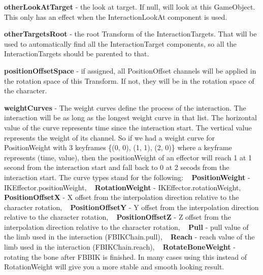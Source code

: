 \begin{DoxyItemize}
\item {\bfseries other\+Look\+At\+Target} -\/ the look at target. If null, will look at this Game\+Object. This only has an effect when the Interaction\+Look\+At component is used.
\item {\bfseries other\+Targets\+Root} -\/ the root Transform of the Interaction\+Targets. That will be used to automatically find all the Interaction\+Target components, so all the Interaction\+Targets should be parented to that.
\item {\bfseries position\+Offset\+Space} -\/ if assigned, all Position\+Offset channels will be applied in the rotation space of this Transform. If not, they will be in the rotation space of the character.
\item {\bfseries weight\+Curves} -\/ The weight curves define the process of the interaction. The interaction will be as long as the longest weight curve in that list. The horizontal value of the curve represents time since the interaction start. The vertical value represents the weight of it\textquotesingle{}s channel. So if we had a weight curve for Position\+Weight with 3 keyframes \{(0, 0), (1, 1), (2, 0)\} where a keyframe represents (time, value), then the position\+Weight of an effector will reach 1 at 1 second from the interaction start and fall back to 0 at 2 secods from the interaction start. The curve types stand for the following\+: ~\newline
{\bfseries Position\+Weight} -\/ I\+K\+Effector.\+position\+Weight, ~\newline
{\bfseries Rotation\+Weight} -\/ I\+K\+Effector.\+rotation\+Weight, ~\newline
{\bfseries Position\+OffsetX} -\/ X offset from the interpolation direction relative to the character rotation, ~\newline
{\bfseries Position\+OffsetY} -\/ Y offset from the interpolation direction relative to the character rotation, ~\newline
{\bfseries Position\+OffsetZ} -\/ Z offset from the interpolation direction relative to the character rotation, ~\newline
{\bfseries Pull} -\/ pull value of the limb used in the interaction (F\+B\+I\+K\+Chain.\+pull), ~\newline
{\bfseries Reach} -\/ reach value of the limb used in the interaction (F\+B\+I\+K\+Chain.\+reach), ~\newline
{\bfseries Rotate\+Bone\+Weight} -\/ rotating the bone after F\+B\+B\+IK is finished. In many cases using this instead of Rotation\+Weight will give you a more stable and smooth looking result. ~\newline

\end{DoxyItemize}
